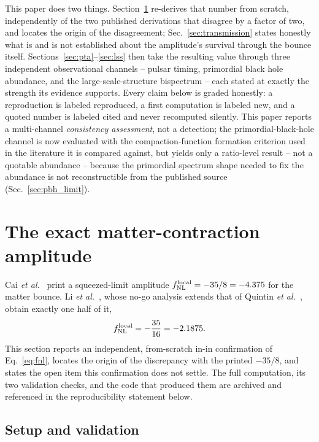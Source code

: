 \documentclass[aps,prd,twocolumn,superscriptaddress,nofootinbib,longbibliography]{revtex4-2}
\newcommand{\fnlloc}{f_{\rm NL}^{\rm local}}
\begin{document}
This paper does two things. Section~\ref{sec:parameter} re-derives that number
from scratch, independently of the two published derivations that disagree by a
factor of two, and locates the origin of the disagreement; Sec.~\ref{sec:transmission}
states honestly what is and is not established about the amplitude's survival
through the bounce itself. Sections~\ref{sec:pta}--\ref{sec:lss} then take the
resulting value through three independent observational channels -- pulsar
timing, primordial black hole abundance, and the large-scale-structure
bispectrum -- each stated at exactly the strength its evidence supports.
Every claim below is graded honestly: a reproduction is labeled reproduced, a
first computation is labeled new, and a quoted number is labeled cited and never
recomputed silently. This paper reports a multi-channel \emph{consistency
assessment}, not a detection; the primordial-black-hole channel is now
evaluated with the compaction-function formation criterion used in the
literature it is compared against, but yields only a ratio-level result -- not
a quotable abundance -- because the primordial spectrum shape needed to fix the
abundance is not reconstructible from the published source (Sec.~\ref{sec:pbh_limit}).

\section{The exact matter-contraction amplitude}
\label{sec:parameter}

Cai \textit{et al.}~\cite{Cai2009} print a squeezed-limit amplitude
$\fnlloc = -35/8 = -4.375$ for the matter bounce. Li \textit{et
al.}~\cite{Li2016}, whose no-go analysis extends that of Quintin \textit{et
al.}~\cite{Quintin2015}, obtain exactly one half of it,
\begin{equation}
  \fnlloc = -\frac{35}{16} = -2.1875 .
  \label{eq:fnl}
\end{equation}
This section reports an independent, from-scratch in-in confirmation of
Eq.~\eqref{eq:fnl}, locates the origin of the discrepancy with the printed
$-35/8$, and states the open item this confirmation does not settle. The full
computation, its two validation checks, and the code that produced them are
archived and referenced in the reproducibility statement below.

\subsection{Setup and validation}
\end{document}
